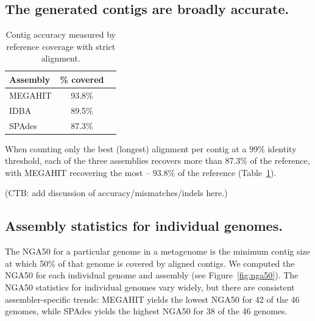 \documentclass[10pt,a4paper,twocolumn]{article}
\begin{document}

\subsection*{The generated contigs are broadly accurate.} 



\begin{table}[!h]
\centering
\caption{Contig accuracy measured by reference coverage with strict alignment.}
\begin{tabular}{|l|c|c|}\hline
\textbf{Assembly} & \textbf {\% covered}
  \\ \hline
MEGAHIT & 93.8\% \\ \hline
IDBA & 89.5\% \\ \hline
SPAdes &  87.3\% \\ \hline
\end{tabular}
\label{table:contig-accuracy}
\end{table}

When counting only the best (longest) alignment per contig at a 99\%
identity threshold, each of the three assemblies recovers more than 87.3\% of the
reference, with MEGAHIT recovering the most -- 93.8\% of the reference
(Table~\ref{table:contig-accuracy}).

(CTB: add discussion of accuracy/mismatches/indels here.)

\subsection*{Assembly statistics for individual genomes.}

The NGA50 for a particular genome in a metagenome is the minimum
contig size at which 50\% of that genome is covered by aligned contigs.
We computed the NGA50 for each individual genome and assembly (see
Figure~\ref{fig:nga50}).  The NGA50 statistics for individual genomes
vary widely, but there are consistent assembler-specific trends:
MEGAHIT yields the lowest NGA50 for 42 of the 46 genomes, while SPAdes
yields the highest NGA50 for 38 of the 46 genomes.
\end{document}
